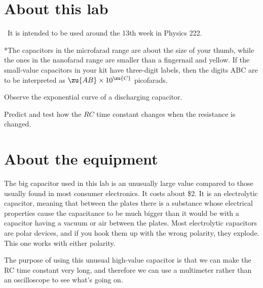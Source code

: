 \renewcommand\thechapter{c2.13a}
\label{lab:rc-circuits}

\section*{About this lab}

\covid\ 
It is intended to be used around the 13th week in Physics 222.

\apparatus
{}

*The capacitors in the microfarad range are about the size of
your thumb, while the ones in the nanofarad range are smaller
than a fingernail and yellow.
If the small-value capacitors in your kit have three-digit labels,
then the digits ABC are to be interpreted as $\zu{AB}\times10^\zu{C}$
picofarads.

\begin{goals}

\item[] Observe the exponential curve of a discharging capacitor.

\item[] Predict and test how the $RC$ time constant changes when the resistance is changed.
\end{goals}

\section*{About the equipment}

The big capacitor used in this lab is an unusually large value compared to those usually found
in most consumer electronics. It costs about \$2. It is an electrolytic capacitor, meaning that
between the plates there is a substance whose electrical properties cause the capacitance to
be much bigger than it would be with a capacitor having a vacuum or air between the plates.
Most electrolytic capacitors are polar devices, and if you hook them up with the wrong polarity,
they explode. This one works with either polarity.

The purpose of using this unusual high-value capacitor is that we can make the RC time constant
very long, and therefore we can use a multimeter rather than an oscilloscope to see what's going
on.


